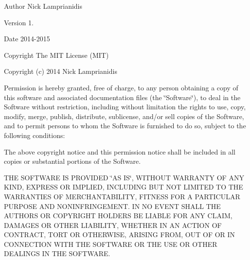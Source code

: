\begin{DoxyAuthor}{Author}
Nick Lamprianidis 
\end{DoxyAuthor}
\begin{DoxyVersion}{Version}
1. 
\end{DoxyVersion}
\begin{DoxyDate}{Date}
2014-\/2015 
\end{DoxyDate}
\begin{DoxyCopyright}{Copyright}
The M\+I\+T License (M\+I\+T) 
\end{DoxyCopyright}
\begin{DoxyParagraph}{}
Copyright (c) 2014 Nick Lamprianidis 
\end{DoxyParagraph}
\begin{DoxyParagraph}{}
Permission is hereby granted, free of charge, to any person obtaining a copy of this software and associated documentation files (the \char`\"{}\+Software\char`\"{}), to deal in the Software without restriction, including without limitation the rights to use, copy, modify, merge, publish, distribute, sublicense, and/or sell copies of the Software, and to permit persons to whom the Software is furnished to do so, subject to the following conditions\+: 
\end{DoxyParagraph}
\begin{DoxyParagraph}{}
The above copyright notice and this permission notice shall be included in all copies or substantial portions of the Software. 
\end{DoxyParagraph}
\begin{DoxyParagraph}{}
T\+H\+E S\+O\+F\+T\+W\+A\+R\+E I\+S P\+R\+O\+V\+I\+D\+E\+D \char`\"{}\+A\+S I\+S\char`\"{}, W\+I\+T\+H\+O\+U\+T W\+A\+R\+R\+A\+N\+T\+Y O\+F A\+N\+Y K\+I\+N\+D, E\+X\+P\+R\+E\+S\+S O\+R I\+M\+P\+L\+I\+E\+D, I\+N\+C\+L\+U\+D\+I\+N\+G B\+U\+T N\+O\+T L\+I\+M\+I\+T\+E\+D T\+O T\+H\+E W\+A\+R\+R\+A\+N\+T\+I\+E\+S O\+F M\+E\+R\+C\+H\+A\+N\+T\+A\+B\+I\+L\+I\+T\+Y, F\+I\+T\+N\+E\+S\+S F\+O\+R A P\+A\+R\+T\+I\+C\+U\+L\+A\+R P\+U\+R\+P\+O\+S\+E A\+N\+D N\+O\+N\+I\+N\+F\+R\+I\+N\+G\+E\+M\+E\+N\+T. I\+N N\+O E\+V\+E\+N\+T S\+H\+A\+L\+L T\+H\+E A\+U\+T\+H\+O\+R\+S O\+R C\+O\+P\+Y\+R\+I\+G\+H\+T H\+O\+L\+D\+E\+R\+S B\+E L\+I\+A\+B\+L\+E F\+O\+R A\+N\+Y C\+L\+A\+I\+M, D\+A\+M\+A\+G\+E\+S O\+R O\+T\+H\+E\+R L\+I\+A\+B\+I\+L\+I\+T\+Y, W\+H\+E\+T\+H\+E\+R I\+N A\+N A\+C\+T\+I\+O\+N O\+F C\+O\+N\+T\+R\+A\+C\+T, T\+O\+R\+T O\+R O\+T\+H\+E\+R\+W\+I\+S\+E, A\+R\+I\+S\+I\+N\+G F\+R\+O\+M, O\+U\+T O\+F O\+R I\+N C\+O\+N\+N\+E\+C\+T\+I\+O\+N W\+I\+T\+H T\+H\+E S\+O\+F\+T\+W\+A\+R\+E O\+R T\+H\+E U\+S\+E O\+R O\+T\+H\+E\+R D\+E\+A\+L\+I\+N\+G\+S I\+N T\+H\+E S\+O\+F\+T\+W\+A\+R\+E. 
\end{DoxyParagraph}


